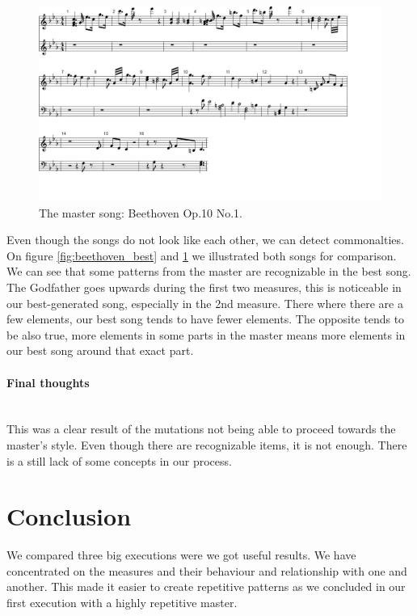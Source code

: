 \documentclass[a4paper]{article}
\begin{document}
\begin{figure}[H]
	\advance\leftskip-1.5cm
	\includegraphics[width=1.2\textwidth]{Fotos/results/beethoven/beethoven_measures.png}
	\caption{The master song: Beethoven Op.10 No.1.}
	\label{fig:beethoven_master}
\end{figure}

Even though the songs do not look like each other, we can detect commonalties. On figure \ref{fig:beethoven_best} and \ref{fig:beethoven_master} we illustrated both songs for comparison. We can see that some patterns from the master are recognizable in the best song. The Godfather goes upwards during the first two measures, this is noticeable in our best-generated song, especially in the 2nd measure. There where there are a few elements, our best song tends to have fewer elements. The opposite tends to be also true, more elements in some parts in the master means more elements in our best song around that exact part.

\paragraph{Final thoughts}\mbox{}\\
This was a clear result of the mutations not being able to proceed towards the master's style. Even though there are recognizable items, it is not enough. There is a still lack of some concepts in our process.

\section{Conclusion}
We compared three big executions were we got useful results. We have concentrated on the measures and their behaviour and relationship with one and another. This made it easier to create repetitive patterns as we concluded in our first execution with a highly repetitive master.
\end{document}

